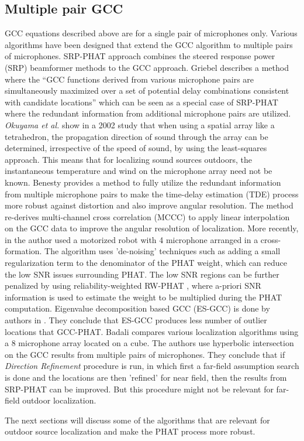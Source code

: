 \subsection{Multiple pair GCC}

GCC equations described above are for a single pair of microphones only. Various algorithms have been designed that extend the GCC algorithm to multiple pairs of microphones. SRP-PHAT approach \cite{dibiase2000high} combines the steered response power (SRP) beamformer methods \cite{krim1996two} to the GCC approach. Griebel \cite{griebel2001microphone} describes a method where the \enquote{GCC functions derived from various microphone pairs are simultaneously maximized over a set of potential delay combinations consistent with candidate locations} which can be seen as a special case of SRP-PHAT where the redundant information from additional microphone pairs are utilized. \textit{Okuyama et al.} show in a 2002 study\cite{okuyama2002study} that when using a spatial array like a tetrahedron, the propagation direction of sound through the array can be determined, irrespective of the speed of sound, by using the least-squares approach. This means that for localizing sound sources outdoors, the instantaneous temperature and wind on the microphone array need not be known. Benesty \cite{benesty2004time} provides a method to fully utilize the redundant information from multiple microphone pairs to make the time-delay estimation (TDE) process more robust against distortion and also improve angular resolution. The method re-derives multi-channel cross correlation (MCCC) to apply linear interpolation on the GCC data to improve the angular resolution of localization. More recently, in \cite{liu2010continuous} the author used a motorized robot with 4 microphone arranged in a cross-formation. The algorithm uses 'de-noising' techniques such as adding a small regularization term to the denominator of the PHAT weight, which can reduce the low SNR issues surrounding PHAT. The low SNR regions can be further penalized by using reliability-weighted RW-PHAT \cite{valin2006robust}, where a-priori SNR information is used to estimate the weight to be multiplied during the PHAT computation. Eigenvalue decomposition based GCC (ES-GCC) is done by authors in \cite{hu2009estimation}. They conclude that ES-GCC produces less number of outlier locations that GCC-PHAT. Badali \cite{badali2009evaluating} compares various localization algorithms using a 8 microphone array located on a cube. The authors use hyperbolic intersection on the GCC results from multiple pairs of microphones. They conclude that if \textit{Direction Refinement} procedure is run, in which first a far-field assumption search is done and the locations are then 'refined' for near field, then the results from SRP-PHAT can be improved. But this procedure might not be relevant for far-field outdoor localization.  

The next sections will discuss some of the algorithms that are relevant for outdoor source localization and make the PHAT process more robust. 
